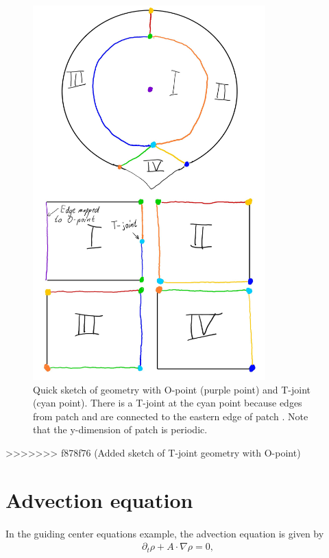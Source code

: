 \documentclass[presentation.tex]{subfiles}
\begin{document}
\begin{figure}
	\centering
	\includegraphics*[width=0.8\textwidth]{images/T-joint_sketch.jpg}
	\caption*{Quick sketch of geometry with O-point (purple point) and T-joint (cyan point).
			  There is a T-joint at the cyan point because 
			  edges from patch {\uppercase\expandafter{}}
			  and {\uppercase\expandafter{}} are connected to the eastern edge
			  of patch {\uppercase\expandafter{}}. 
			  Note that the y-dimension of patch {\uppercase\expandafter{}}
			  is periodic.}
\end{figure}
\newpage

>>>>>>> f878f76 (Added sketch of T-joint geometry with O-point)


\section{Advection equation}
\paragraph{}
In the guiding center equations example, the advection equation is given by 
\begin{equation}
\begin{aligned}
	\partial_t \rho + A\cdot\nabla \rho = 0,
\end{aligned}
\end{equation}
\end{document}
